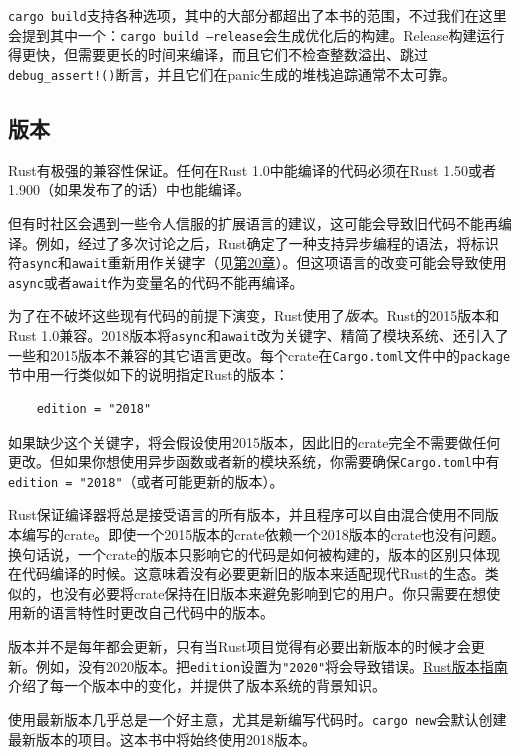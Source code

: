 \texttt{cargo build}支持各种选项，其中的大部分都超出了本书的范围，不过我们在这里会提到其中一个：\texttt{cargo build --release}会生成优化后的构建。Release构建运行得更快，但需要更长的时间来编译，而且它们不检查整数溢出、跳过\texttt{debug\_assert!()}断言，并且它们在panic生成的堆栈追踪通常不太可靠。

\subsection{版本}

Rust有极强的兼容性保证。任何在Rust 1.0中能编译的代码必须在Rust 1.50或者1.900（如果发布了的话）中也能编译。


但有时社区会遇到一些令人信服的扩展语言的建议，这可能会导致旧代码不能再编译。例如，经过了多次讨论之后，Rust确定了一种支持异步编程的语法，将标识符\texttt{async}和\texttt{await}重新用作关键字（见\hyperref[ch20]{第20章}）。但这项语言的改变可能会导致使用\texttt{async}或者\texttt{await}作为变量名的代码不能再编译。

为了在不破坏这些现有代码的前提下演变，Rust使用了\emph{版本}。Rust的2015版本和Rust 1.0兼容。2018版本将\texttt{async}和\texttt{await}改为关键字、精简了模块系统、还引入了一些和2015版本不兼容的其它语言更改。每个crate在\texttt{Cargo.toml}文件中的\texttt{package}节中用一行类似如下的说明指定Rust的版本：
\begin{verbatim}
    edition = "2018"
\end{verbatim}

如果缺少这个关键字，将会假设使用2015版本，因此旧的crate完全不需要做任何更改。但如果你想使用异步函数或者新的模块系统，你需要确保\texttt{Cargo.toml}中有\texttt{edition = "2018"}（或者可能更新的版本）。

Rust保证编译器将总是接受语言的所有版本，并且程序可以自由混合使用不同版本编写的crate。即使一个2015版本的crate依赖一个2018版本的crate也没有问题。换句话说，一个crate的版本只影响它的代码是如何被构建的，版本的区别只体现在代码编译的时候。这意味着没有必要更新旧的版本来适配现代Rust的生态。类似的，也没有必要将crate保持在旧版本来避免影响到它的用户。你只需要在想使用新的语言特性时更改自己代码中的版本。

版本并不是每年都会更新，只有当Rust项目觉得有必要出新版本的时候才会更新。例如，没有2020版本。把\texttt{edition}设置为\texttt{"2020"}将会导致错误。\href{https://doc.rust-lang.org/stable/edition-guide}{Rust版本指南}介绍了每一个版本中的变化，并提供了版本系统的背景知识。

使用最新版本几乎总是一个好主意，尤其是新编写代码时。\texttt{cargo new}会默认创建最新版本的项目。这本书中将始终使用2018版本。

